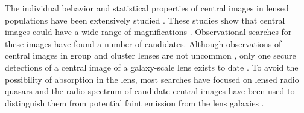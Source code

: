 \documentclass[chicago]{emulateapj}
\begin{document}





The individual behavior and statistical properties of central images in lensed populations have been extensively studied \citep[e.g.][]{Wallington:93, Evans:02, Keeton:03}. These studies show that central images could have a wide range of magnifications \citep[e.g.,][]{Keeton:03}. 
Observational searches for these images have found a number of candidates. Although observations
of central images in group and cluster lenses are not uncommon \citep[e.g.,][]{Inada:08}, only one secure detections of a central image of a galaxy-scale lens exists to date \citep{Winn:04}. To avoid the possibility of absorption in the lens, most searches have focused on lensed radio quasars and the radio spectrum of candidate central images have been used to distinguish them from potential faint emission from the lens galaxies \citep[e.g.,][]{Zhang:07}.

\end{document}
